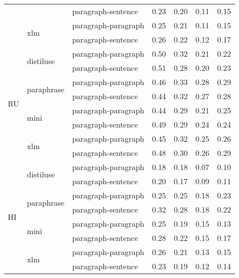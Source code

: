\begin{tabular}{lllrrrr}
 &  & paragraph-sentence & 0.23 & 0.20 & 0.11 & 0.15 \\
\cline{2-7}
 & \multirow[t]{2}{*}{xlm} & paragraph-paragraph & 0.25 & 0.21 & 0.11 & 0.15 \\
 &  & paragraph-sentence & 0.26 & 0.22 & 0.12 & 0.17 \\
\cline{1-7} \cline{2-7}
\multirow[t]{8}{*}{RU} & \multirow[t]{2}{*}{distiluse} & paragraph-paragraph & 0.50 & 0.32 & 0.21 & 0.22 \\
 &  & paragraph-sentence & 0.51 & 0.28 & 0.20 & 0.23 \\
\cline{2-7}
 & \multirow[t]{2}{*}{paraphrase} & paragraph-paragraph & 0.46 & 0.33 & 0.28 & 0.29 \\
 &  & paragraph-sentence & 0.44 & 0.32 & 0.27 & 0.28 \\
\cline{2-7}
 & \multirow[t]{2}{*}{mini} & paragraph-paragraph & 0.44 & 0.29 & 0.21 & 0.25 \\
 &  & paragraph-sentence & 0.49 & 0.29 & 0.24 & 0.24 \\
\cline{2-7}
 & \multirow[t]{2}{*}{xlm} & paragraph-paragraph & 0.45 & 0.32 & 0.25 & 0.26 \\
 &  & paragraph-sentence & 0.48 & 0.30 & 0.26 & 0.29 \\
\cline{1-7} \cline{2-7}
\multirow[t]{8}{*}{HI} & \multirow[t]{2}{*}{distiluse} & paragraph-paragraph & 0.18 & 0.18 & 0.07 & 0.10 \\
 &  & paragraph-sentence & 0.20 & 0.17 & 0.09 & 0.11 \\
\cline{2-7}
 & \multirow[t]{2}{*}{paraphrase} & paragraph-paragraph & 0.25 & 0.25 & 0.18 & 0.23 \\
 &  & paragraph-sentence & 0.32 & 0.28 & 0.18 & 0.22 \\
\cline{2-7}
 & \multirow[t]{2}{*}{mini} & paragraph-paragraph & 0.25 & 0.19 & 0.15 & 0.13 \\
 &  & paragraph-sentence & 0.28 & 0.22 & 0.15 & 0.17 \\
\cline{2-7}
 & \multirow[t]{2}{*}{xlm} & paragraph-paragraph & 0.26 & 0.21 & 0.13 & 0.15 \\
 &  & paragraph-sentence & 0.23 & 0.19 & 0.12 & 0.14 \\
\cline{1-7} \cline{2-7}
\bottomrule
\end{tabular}
